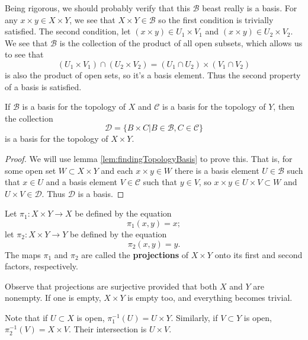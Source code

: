 \begin{rmk}\label{rmk:productTopologyBasis}
Being rigorous, we should probably verify that this $\mathscr{B}$
beast really is a basis. For any $x\times y\in X\times Y$, we see
that $X\times Y\in\mathscr{B}$ so the first condition is
trivially satisfied. The second condition, let $(x\times y)\in
U_{1}\times V_{1}$ and $(x\times y)\in U_{2}\times V_{2}$. We see
that $\mathscr{B}$ is the collection of the product of all open
subsets, which allows us to see that
\begin{equation}%
(U_{1}\times V_{1})\cap(U_{2}\times V_{2}) = (U_{1}\cap
  U_{2})\times(V_{1}\cap V_{2})
\end{equation}
is also the product of open sets, so it's a basis element. Thus
the second property of a basis is satisfied.
\end{rmk}
\begin{thm}\label{thm:productOfBases}
If $\mathscr{B}$ is a basis for the topology of $X$ and
$\mathscr{C}$ is a basis for the topology of $Y$, then the
collection
\begin{equation}%
\mathscr{D} = \{B\times C|B\in\mathscr{B},C\in\mathscr{C}\}
\end{equation}
is a basis for the topology of $X\times Y$.
\end{thm}
\begin{proof}
We will use lemma \ref{lem:findingTopologyBasis} to prove
this. That is, for some open set $W\subset X\times Y$ and each
$x\times y\in W$ there is a basis element $U\in\mathscr{B}$ such
that $x\in U$ and a basis element $V\in\mathscr{C}$ such that
$y\in V$, so $x\times y\in U\times V\subset W$ and $U\times
V\in\mathscr{D}$. Thus $\mathscr{D}$ is a basis.
\end{proof}
\begin{defn}\label{defn:projection}
Let $\pi_{1}:X\times Y\to X$ be defined by the equation
\begin{equation}%
\pi_{1}(x,y)=x;
\end{equation}
let $\pi_{2}:X\times Y\to Y$ be defined by the equation
\begin{equation}%
\pi_{2}(x,y) = y.
\end{equation}
The maps $\pi_{1}$ and $\pi_{2}$ are called the
\textbf{projections} of $X\times Y$ onto its first and second
factors, respectively.
\end{defn}
\begin{rmk}\label{rmk:projectionsAreSurjective}
Observe that projections are surjective provided that both $X$
and $Y$ are nonempty. If one is empty, $X\times Y$ is empty too,
and everything becomes trivial.
\end{rmk}
\begin{rmk}\label{rmk:inverseOfProjections}
Note that if $U\subset X$ is open, $\pi_{1}^{-1}(U)=U\times
Y$. Similarly, if $V\subset Y$ is open, $\pi_{2}^{-1}(V)=X\times
V$. Their intersection is $U\times V$.
\end{rmk}

